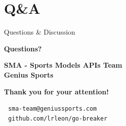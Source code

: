 \documentclass[aspectratio=169]{beamer}
\begin{document}
\section{Q\&A}

\begin{frame}{Questions \& Discussion}
    \begin{center}
        \Huge \textbf{Questions?}
        
        \vspace{1cm}
        
        \Large
        \textbf{SMA - Sports Models APIs Team}\\
        \textbf{Genius Sports}
        
        \vspace{0.5cm}
        
        
        \vspace{0.5cm}
        
        \textbf{Thank you for your attention!}
        
        \vspace{0.3cm}
        
        \normalsize
        📧 \texttt{sma-team@geniussports.com}\\
        🔗 \texttt{github.com/lrleon/go-breaker}
    \end{center}
\end{frame}
\end{document}
